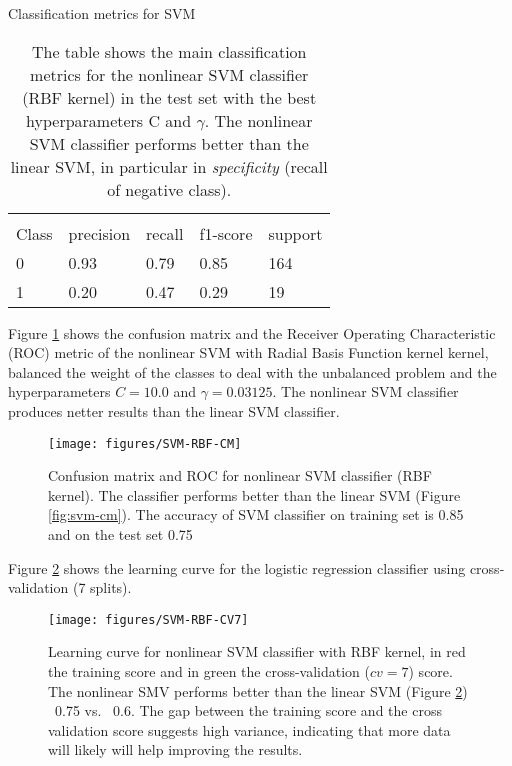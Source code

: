 \documentclass[11pt]{article}
\begin{document}
\begin{table}[H]
\caption{Classification metrics for SVM} \label{tab:svmnonlinear} 
\begin{center} 
\begin{tabular}{lllll}
\hline
\multicolumn{1}{c}{} \\
Class & precision & recall & f1-score & support     \\
\hline
0 & 0.93  &    0.79   &   0.85   &    164 \\
1 & 0.20  &    0.47   &   0.29   &    19 \\
\hline
\end{tabular}
\caption{The table shows the main classification metrics for the nonlinear SVM classifier (RBF kernel) in the test set with the best hyperparameters C and $\gamma$. The nonlinear SVM classifier performs better than the linear SVM, in particular in \emph{specificity} (recall of negative class).}
\end{center}
\end{table}

Figure \ref{fig:svm-rbf-cm} shows the confusion matrix and the Receiver Operating Characteristic (ROC) metric of the nonlinear SVM with Radial Basis Function kernel kernel, balanced the weight of the classes to deal with the unbalanced problem and the hyperparameters $C= 10.0$ and $\gamma= 0.03125$. The nonlinear SVM classifier produces netter results than the linear SVM classifier.

\begin{figure}[H]
        \centering
        \texttt{[image: figures/SVM-RBF-CM]}
        \caption{Confusion matrix and ROC for nonlinear SVM classifier (RBF kernel). The classifier performs better than the linear SVM (Figure \ref{fig:svm-cm}). The accuracy of SVM classifier on training set is 0.85 and on the test set 0.75}
\label{fig:svm-rbf-cm}
\end{figure}

Figure \ref{fig:svm-cv7} shows the learning curve for the logistic regression classifier using cross-validation (7 splits).
\begin{figure}[H]
        \centering
        \texttt{[image: figures/SVM-RBF-CV7]}
        \caption{Learning curve for nonlinear SVM classifier with RBF kernel, in red the training score and in green the cross-validation ($cv=7$) score. The nonlinear SMV performs better than the linear SVM (Figure \ref{fig:svm-cv7}) ~0.75 vs. ~0.6. The gap between the training score and the cross validation score suggests high variance, indicating that more data will likely will help improving the results. 
        }
\label{fig:svm-cv7}
\end{figure}
\end{document}
